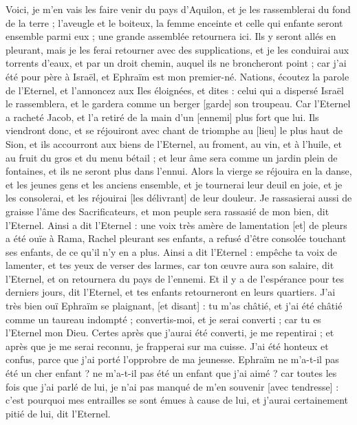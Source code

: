 \begin{multicols}{2}
Voici, je m'en vais les faire venir du pays d'Aquilon, et je les rassemblerai du fond de la terre ; l'aveugle et le boiteux, la femme enceinte et celle qui enfante seront ensemble parmi eux ; une grande assemblée retournera ici.
Ils y seront allés en pleurant, mais je les ferai retourner avec des supplications, et je les conduirai aux torrents d'eaux, et par un droit chemin, auquel ils ne broncheront point ; car j'ai été pour père à Israël, et Ephraïm est mon premier-né.
Nations, écoutez la parole de l'Eternel, et l'annoncez aux Iles éloignées, et dites : celui qui a dispersé Israël le rassemblera, et le gardera comme un berger [garde] son troupeau.
Car l'Eternel a racheté Jacob, et l'a retiré de la main d'un [ennemi] plus fort que lui.
Ils viendront donc, et se réjouiront avec chant de triomphe au [lieu] le plus haut de Sion, et ils accourront aux biens de l'Eternel, au froment, au vin, et à l'huile, et au fruit du gros et du menu bétail ; et leur âme sera comme un jardin plein de fontaines, et ils ne seront plus dans l'ennui.
Alors la vierge se réjouira en la danse, et les jeunes gens et les anciens ensemble, et je tournerai leur deuil en joie, et je les consolerai, et les réjouirai [les délivrant] de leur douleur.
Je rassasierai aussi de graisse l'âme des Sacrificateurs, et mon peuple sera rassasié de mon bien, dit l'Eternel.
Ainsi a dit l'Eternel : une voix très amère de lamentation [et] de pleurs a été ouïe à Rama, Rachel pleurant ses enfants, a refusé d'être consolée touchant ses enfants, de ce qu'il n'y en a plus.
Ainsi a dit l'Eternel : empêche ta voix de lamenter, et tes yeux de verser des larmes, car ton œuvre aura son salaire, dit l'Eternel, et on retournera du pays de l'ennemi.
Et il y a de l'espérance pour tes derniers jours, dit l'Eternel, et tes enfants retourneront en leurs quartiers.
J'ai très bien ouï Ephraïm se plaignant, [et disant] : tu m'as châtié, et j'ai été châtié comme un taureau indompté ; convertis-moi, et je serai converti ; car tu es l'Eternel mon Dieu.
Certes après que j'aurai été converti, je me repentirai ; et après que je me serai reconnu, je frapperai sur ma cuisse. J'ai été honteux et confus, parce que j'ai porté l'opprobre de ma jeunesse.
Ephraïm ne m'a-t-il pas été un cher enfant ? ne m'a-t-il pas été un enfant que j'ai aimé ? car toutes les fois que j'ai parlé de lui, je n'ai pas manqué de m'en souvenir [avec tendresse] : c'est pourquoi mes entrailles se sont émues à cause de lui, et j'aurai certainement pitié de lui, dit l'Eternel.

\end{multicols}
